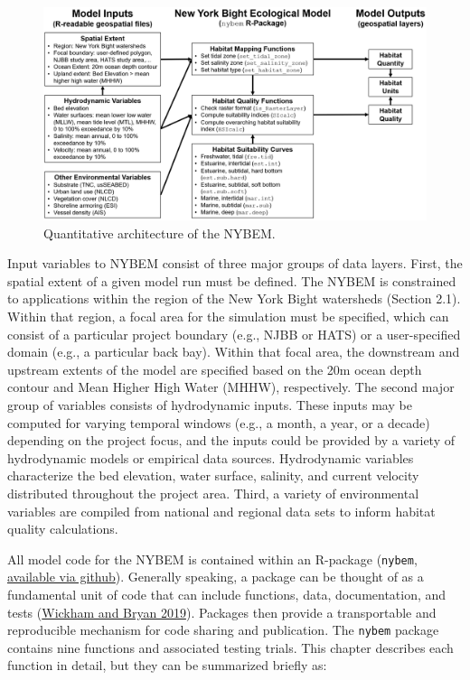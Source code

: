 \documentclass[
]{book}
\begin{document}
\begin{figure}
\includegraphics[width=17.47in]{ZZ_Fig04.01_NYBEM.Architecture} \caption{Quantitative architecture of the NYBEM.}\label{fig:unnamed-chunk-8}
\end{figure}

Input variables to NYBEM consist of three major groups of data layers. First, the spatial extent of a given model run must be defined. The NYBEM is constrained to applications within the region of the New York Bight watersheds (Section 2.1). Within that region, a focal area for the simulation must be specified, which can consist of a particular project boundary (e.g., NJBB or HATS) or a user-specified domain (e.g., a particular back bay). Within that focal area, the downstream and upstream extents of the model are specified based on the 20m ocean depth contour and Mean Higher High Water (MHHW), respectively. The second major group of variables consists of hydrodynamic inputs. These inputs may be computed for varying temporal windows (e.g., a month, a year, or a decade) depending on the project focus, and the inputs could be provided by a variety of hydrodynamic models or empirical data sources. Hydrodynamic variables characterize the bed elevation, water surface, salinity, and current velocity distributed throughout the project area. Third, a variety of environmental variables are compiled from national and regional data sets to inform habitat quality calculations.

All model code for the NYBEM is contained within an R-package (\texttt{nybem}, \href{https://github.com/MVR-GIS}{available via github}). Generally speaking, a package can be thought of as a fundamental unit of code that can include functions, data, documentation, and tests (\href{https://r-pkgs.org/}{Wickham and Bryan 2019}). Packages then provide a transportable and reproducible mechanism for code sharing and publication. The \texttt{nybem} package contains nine functions and associated testing trials. This chapter describes each function in detail, but they can be summarized briefly as:
\end{document}
